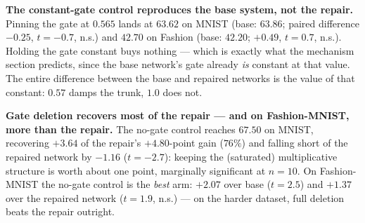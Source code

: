 \documentclass[review,12pt,number]{elsarticle}
\begin{document}
\begin{table}[t]
\centering
\caption{Four-arm control experiment ($n=10$ paired seeds, $\rho=0$, matched width $n_h=256$, matched usage-weighted anchors). Differences are paired against the base arm of the same dataset and seed; $p$ is Holm-corrected within each metric family; $d_z$ is the paired standardized effect size.}
\label{tab:ablation}
\end{table}


\textbf{The constant-gate control reproduces the base system, not the
repair.} Pinning the gate at $0.565$ lands at $63.62$ on MNIST (base:
$63.86$; paired difference $-0.25$, $t{=}-0.7$, n.s.) and $42.70$ on
Fashion (base: $42.20$; $+0.49$, $t{=}0.7$, n.s.). Holding the gate
constant buys nothing --- which is exactly what the mechanism section
predicts, since the base network's gate already \emph{is} constant at
that value. The entire difference between the base and repaired
networks is the value of that constant: $0.57$ damps the trunk,
$1.0$ does not.

\textbf{Gate deletion recovers most of the repair --- and on
Fashion-MNIST, more than the repair.} The no-gate control reaches
$67.50$ on MNIST, recovering $+3.64$ of the repair's $+4.80$-point gain
($76\%$) and falling short of the repaired network by $-1.16$
($t{=}-2.7$): keeping the (saturated) multiplicative structure is worth
about one point, marginally significant at $n{=}10$. On Fashion-MNIST
the no-gate control is the \emph{best} arm: $+2.07$ over base
($t{=}2.5$) and $+1.37$ over the repaired network ($t{=}1.9$, n.s.) ---
on the harder dataset, full deletion beats the repair outright.
\end{document}
